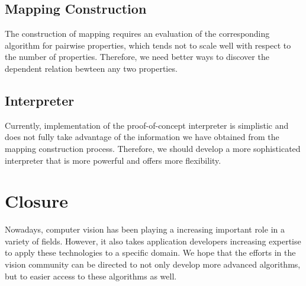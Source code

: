 \subsection{Mapping Construction}
The construction of mapping requires an evaluation of the corresponding algorithm for pairwise properties, which tends not to scale well with respect to the number of properties. Therefore, we need better ways to discover the dependent relation bewteen any two properties.

\subsection{Interpreter}
Currently, implementation of the proof-of-concept interpreter is simplistic and does not fully take advantage of the information we have obtained from the mapping construction process. Therefore, we should develop a more sophisticated interpreter that is more powerful and offers more flexibility.

\section{Closure}
Nowadays, computer vision has been playing a increasing important role in a variety of fields. However, it also takes application developers increasing expertise to apply these technologies to a specific domain. We hope that the efforts in the vision community can be directed to not only develop more advanced algorithms, but to easier access to these algorithms as well.
